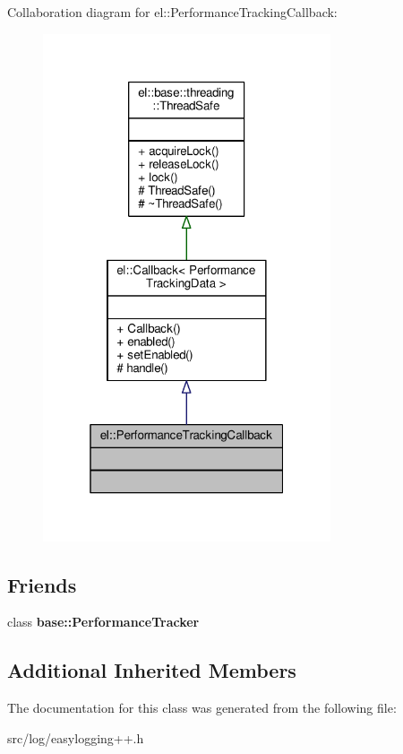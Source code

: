Collaboration diagram for el\+:\+:Performance\+Tracking\+Callback\+:
\nopagebreak
\begin{figure}[H]
\begin{center}
\leavevmode
\includegraphics[width=241pt]{d2/d2c/classel_1_1PerformanceTrackingCallback__coll__graph}
\end{center}
\end{figure}
\subsection*{Friends}
\begin{DoxyCompactItemize}
\item 
class {\bfseries base\+::\+Performance\+Tracker}\hypertarget{classel_1_1PerformanceTrackingCallback_a05f271f9cc2531409fe682c6ce0d9feb}{}\label{classel_1_1PerformanceTrackingCallback_a05f271f9cc2531409fe682c6ce0d9feb}

\end{DoxyCompactItemize}
\subsection*{Additional Inherited Members}


The documentation for this class was generated from the following file\+:\begin{DoxyCompactItemize}
\item 
src/log/easylogging++.\+h\end{DoxyCompactItemize}
